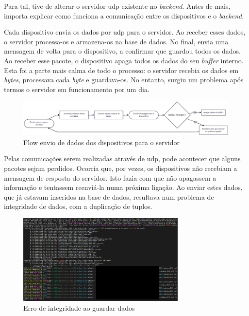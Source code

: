 Para tal, tive de alterar o servidor \acs{udp} existente no \textit{backend}. Antes de mais, importa explicar como funciona a comunicação entre os dispositivos e o \textit{backend}.

Cada dispositivo envia os dados por \acs{udp} para o servidor. Ao receber esses dados, o servidor processa-os e armazena-os na base de dados. No final, envia uma mensagem de volta para o dispositivo, a confirmar que guardou todos os dados. Ao receber esse pacote, o dispositivo apaga todos os dados do seu \textit{buffer} interno. Esta foi a parte mais calma de todo o processo: o servidor recebia os dados em \textit{bytes}, processava cada \textit{byte} e guardava-os. No entanto, surgiu um problema após termos o servidor em funcionamento por um dia.

\begin{figure}[!h]
	\centering
	\includegraphics[width=\textwidth]{figs/flowEnvioDados.png}
	\caption{Flow envio de dados dos dispositivos para o servidor}
	\label{fig:flowDevicesServer}
\end{figure}

Pelas comunicações serem realizadas através de \acs{udp}, pode acontecer que alguns pacotes sejam perdidos. Ocorria que, por vezes, os dispositivos não recebiam a mensagem de resposta do servidor. Isto fazia com que não apagassem a informação e tentassem reenviá-la numa próxima ligação. Ao enviar estes dados, que já estavam inseridos na base de dados, resultava num problema de integridade de dados, com a duplicação de tuplos.

\begin{figure}[!h]
	\centering
	\includegraphics[width=0.75\textwidth]{figs/error.png}
	\caption{Erro de integridade ao guardar dados}
	\label{fig:integretyErro}
\end{figure}

